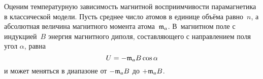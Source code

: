 %



Оценим температурную зависимость магнитной восприимчивости парамагнетика
в классической модели.
Пусть среднее число атомов в единице объёма равно~$n$, а абсолютная величина
магнитного момента атома~$\mathfrak{m}_{a}$.
В~магнитном поле с индукцией~$B$ энергия магнитного диполя,
составляющего с направлением поля угол $\alpha$, равна
\begin{equation*}
	U = - \mathfrak{m}_{a}B \cos \alpha
\end{equation*}
и может меняться в диапазоне от $-\mathfrak{m}_{a}B$ до $+\mathfrak{m}_{a}B$.

